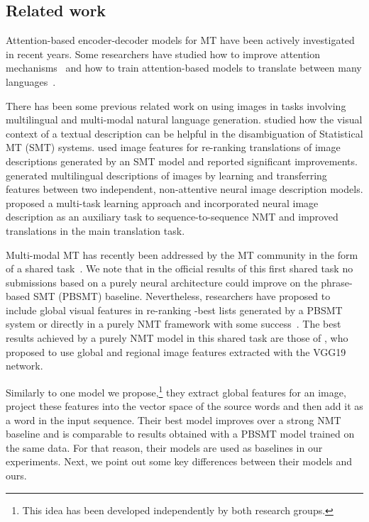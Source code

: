 \documentclass[11pt,twocolumn]{article}
\begin{document}
\subsection{Related work}
\label{sec:background}

Attention-based encoder-decoder models for MT have been actively investigated in recent years.
Some researchers have studied how to improve attention mechanisms~\cite{Luongetal2015,Tuetal2016} and how to train attention-based models to translate between many languages~\cite{Dongetal2015,Firatetal2016}.


There has been some previous related work on using images in tasks involving multilingual and multi-modal natural language generation.
 studied how the visual context of a textual description can be helpful in the disambiguation of Statistical MT (SMT) systems.
 used image features for re-ranking translations of image descriptions generated by an SMT model and reported significant improvements.
 generated multilingual descriptions of images
by learning and transferring features between
two independent, non-attentive neural image description models.
 proposed a multi-task learning approach and incorporated neural image description as an auxiliary task to sequence-to-sequence NMT and improved translations in the main translation task.

Multi-modal MT has recently been addressed by the MT community in the form of a shared task~\cite{Speciaetal2016}.
We note that in the official results of this first shared task no submissions based on a purely neural architecture could improve on the phrase-based SMT (PBSMT) baseline.
Nevertheless, researchers have proposed to include global visual features in re-ranking -best lists generated by a PBSMT system or directly in a purely NMT framework with some success~\cite{Caglayanetal2016,CalixtoElliottFrank2016,Libovickyetal2016,Shahetal2016}.
The best results achieved by a purely NMT model in this shared task are those of , who proposed to use global and regional image features extracted with the VGG19 network.

Similarly to one model we propose,\footnote{This idea has been developed independently by both research groups.} they extract global features for an image, project these features into the vector space of the source words and then add it as a word in the input sequence.
Their best model improves over a strong NMT baseline and is comparable to results obtained with a PBSMT model trained on the same data.
For that reason, their models are used as baselines in our experiments.
Next, we point out some key differences between their models and ours.
\end{document}
